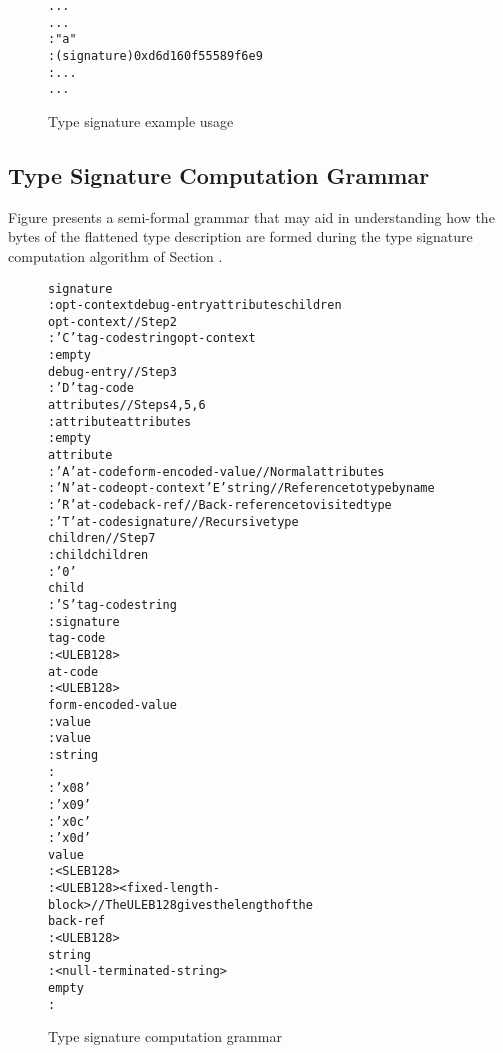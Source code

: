 \begin{figure}
\begin{dwflisting}
\begin{alltt}
  \DWTAGcompileunit
  ...
  \DWTAGsubprogram
    ...
    \DWTAGvariable
      \DWATname : "a"
      \DWATtype : (signature) 0xd6d160f5 5589f6e9
      \DWATlocation : ...
    ...
\end{alltt}
\end{dwflisting}
\caption{Type signature example usage}
\label{fig:typesignatureexampleusage}
\end{figure}

\subsection{Type Signature Computation Grammar}
\label{app:typesignaturecomputationgrammar}

Figure 
presents a semi-formal grammar that may aid in understanding
how the bytes of the flattened type description are formed
during the type signature computation algorithm of
Section . 

\begin{figure}[h]
\begin{dwflisting}
\begin{alltt}
signature
    : opt-context debug-entry attributes children
opt-context               // Step 2
    : 'C' tag-code string opt-context
    : empty
debug-entry               // Step 3
    : 'D' tag-code
attributes                // Steps 4, 5, 6
    : attribute attributes
    : empty
attribute
    : 'A' at-code form-encoded-value     // Normal attributes
    : 'N' at-code opt-context 'E' string // Reference to type by name
    : 'R' at-code back-ref               // Back-reference to visited type
    : 'T' at-code signature              // Recursive type
children                 //  Step 7
    : child children
    : '0'
child
    : 'S' tag-code string
    : signature
tag-code
    : <ULEB128>
at-code
    : <ULEB128>
form-encoded-value
    : \DWFORMsdata value 
    : \DWFORMflag value 
    : \DWFORMstring string 
    : \DWFORMblock {} 
\DWFORMstring {}
    : 'x08'
\DWFORMblock  {}
    : 'x09'
\DWFORMflag {}
    : 'x0c'
\DWFORMsdata {}
    : 'x0d'
value
    : <SLEB128>
    : <ULEB128> <fixed-length-block> // The ULEB128 gives the length of the 
back-ref
    : <ULEB128>
string
    : <null-terminated-string>
empty
    :
\end{alltt}
\end{dwflisting}
\caption{Type signature computation grammar}
\label{fig:typesignaturecomputationgrammar}
\end{figure}


